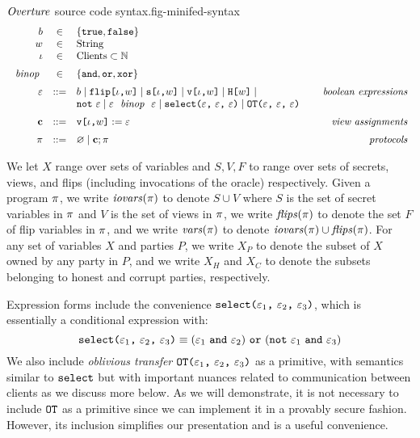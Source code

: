 \begin{fpfig}[t]{$\mathit{Overture}$ source code syntax.}{fig-minifed-syntax}
$$
\begin{array}{rcl@{\hspace{8mm}}r}
b &\in& \{ \etrue, \efalse \} \\
w &\in& \mathrm{String} \\ 
\cid &\in& \mathrm{Clients} \subset  \mathbb{N} \\[2mm]%
\bop &\in& \{ \eand, \eor, \exor \} \\[2mm]
\be &::=& b \mid \flip{\cid}{w} \mid \secret{\cid}{w} \mid \view{\cid}{w} \mid \oracle{w} \mid & \textit{boolean expressions}\\
& &  \enot\ \be \mid \be\ \bop\ \be \mid \select{\be}{\be}{\be} \mid \OT{\be}{\be}{\be} \\[2mm]
\instr &::=& \eassign{\view{\cid}{w}}{\be} & \textit{view assignments} \\[2mm]
\prog &::=& \varnothing \mid \instr; \prog & \textit{protocols}
\end{array}
$$ 
\end{fpfig}

We let $X$ range over sets of variables and $S,V,F$ to range over sets
of secrets, views, and flips (including invocations of the oracle)
respectively. Given a program $\pi$, we write $\mathit{iovars}(\pi)$ to
denote $S \cup V$ where $S$ is the set of secret variables in $\pi$
and $V$ is the set of views in $\pi$, we write $\mathit{flips}(\pi)$
to denote the set $F$ of flip variables in $\pi$, and we
write $\mathit{vars}(\pi)$ to denote $\mathit{iovars}(\pi) \cup \mathit{flips}(\pi)$. For any set of
variables $X$ and parties $P$, we write $X_P$ to denote the subset of
$X$ owned by any party in $P$, and we write $X_H$ and $X_C$ to denote
the subsets belonging to honest and corrupt parties, respectively.

Expression forms include the convenience
$\texttt{select(} \varepsilon_1 \texttt{,}\ \varepsilon_2 \texttt{,}\ \varepsilon_3 \texttt{)}$, which is essentially a conditional
expression with:
$$
\texttt{select(} \varepsilon_1 \texttt{,}\ \varepsilon_2 \texttt{,}\ \varepsilon_3 \texttt{)} \equiv (\varepsilon_1\ \texttt{and}\ \varepsilon_2)\ \texttt{or}\ (\texttt{not}\ \varepsilon_1\ \texttt{and}\ \varepsilon_3)
$$
We also include \emph{oblivious transfer} $\texttt{OT(} \varepsilon_1 \texttt{,}\ \varepsilon_2 \texttt{,}\ \varepsilon_3 \texttt{)}$ as a primitive,
with semantics similar to $\texttt{select}$ but with important nuances
related to communication between clients as we discuss more below.
As we will demonstrate, it is not necessary to include $\texttt{OT}$
as a primitive since we can implement it in a provably secure
fashion. However, its inclusion simplifies our presentation and is a useful
convenience.

